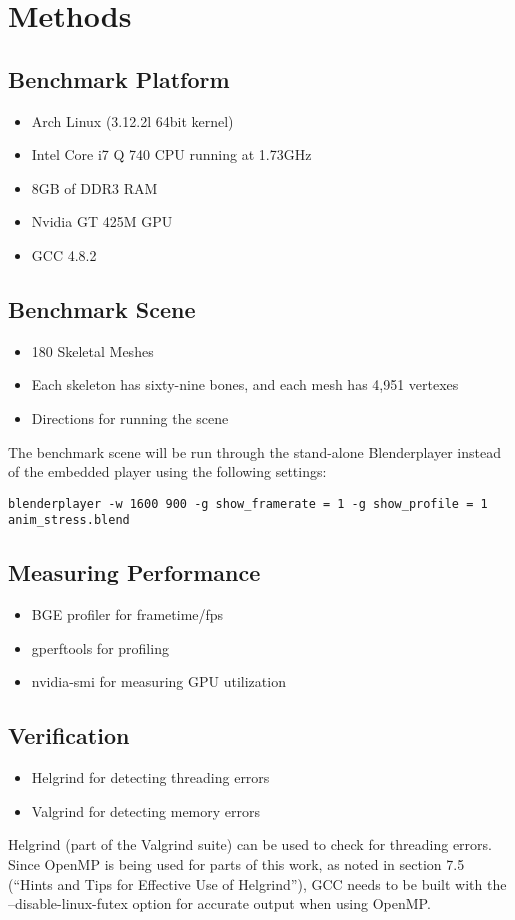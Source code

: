 \section{Methods}

\subsection{Benchmark Platform}
\begin{itemize}
 \item Arch Linux (3.12.2l 64bit kernel)
 \item Intel Core i7 Q 740 CPU running at 1.73GHz
 \item 8GB of DDR3 RAM
 \item Nvidia GT 425M GPU
 \item GCC 4.8.2
\end{itemize}

\subsection{Benchmark Scene}
\begin{itemize}
 \item 180 Skeletal Meshes
 \item Each skeleton has sixty-nine bones, and each mesh has 4,951 vertexes
 \item Directions for running the scene
\end{itemize}

The benchmark scene will be run through the stand-alone Blenderplayer instead of the embedded player using the following settings:
\begin{verbatim}
blenderplayer -w 1600 900 -g show_framerate = 1 -g show_profile = 1 anim_stress.blend
\end{verbatim}

\subsection{Measuring Performance}
\begin{itemize}
 \item BGE profiler for frametime/fps
 \item gperftools for profiling
 \item nvidia-smi for measuring GPU utilization
\end{itemize}

\subsection{Verification}
\begin{itemize}
 \item Helgrind for detecting threading errors
 \item Valgrind for detecting memory errors
\end{itemize}

Helgrind (part of the Valgrind suite\cite{valgrind}) can be used to check for threading errors. Since OpenMP is being used for parts of this work, as noted in section 7.5 (``Hints and Tips for Effective Use of Helgrind'')\cite{hgmanual}, GCC needs to be built with the --disable-linux-futex option for accurate output when using OpenMP.
